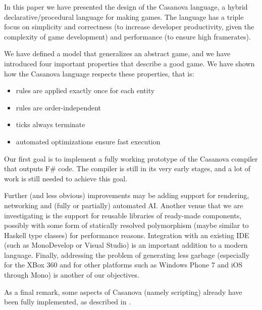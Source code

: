 
In this paper we have presented the design of the Casanova language, a hybrid declarative/procedural language for making games. The language has a triple focus on simplicity and correctness (to increase developer productivity, given the complexity of game development) and performance (to ensure high framerates).

We have defined a model that generalizes an abstract game, and we have introduced four important properties that describe a good game. We have shown how the Casanova language respects these properties, that is:

\begin{itemize}
\item rules are applied exactly once for each entity
\item rules are order-independent
\item ticks always terminate
\item automated optimizations ensure fast execution
\end{itemize}

Our first goal is to implement a fully working prototype of the Casanova compiler that outputs F\# code. The compiler is still in its very early stages, and a lot of work is still needed to achieve this goal.

Further (and less obvious) improvements may be adding support for rendering, networking and (fully or partially) automated AI. Another venue that we are investigating is the support for reusable libraries of ready-made components, possibly with some form of statically resolved polymorphism (maybe similar to Haskell type classes) for performance reasons. Integration with an existing IDE (such as MonoDevelop or Visual Studio) is an important addition to a modern language. Finally, addressing the problem of generating less garbage (especially for the XBox 360 and for other platforms such as Windows Phone 7 and iOS through Mono) is another of our objectives.

As a final remark, some aspects of Casanova (namely scripting) already have been fully implemented, as described in \cite{FRIENDLY_FSHARP}.